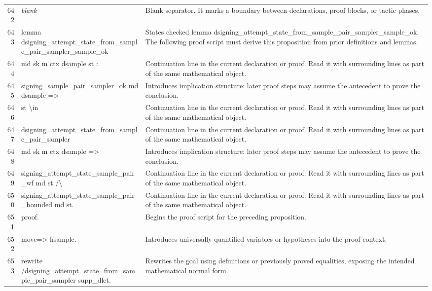\documentclass[10pt]{article}
\begin{document}
\begin{longtable}{r L{0.53\textwidth} L{0.37\textwidth}}
642 & {\ttfamily\scriptsize \emph{blank}} & Blank separator.  It marks a boundary between declarations, proof blocks, or tactic phases. \\
643 & {\ttfamily\scriptsize lemma dsigning\_attempt\_state\_from\_sample\_pair\_sampler\_sample\_ok} & States checked lemma dsigning\_attempt\_state\_from\_sample\_pair\_sampler\_sample\_ok.  The following proof script must derive this proposition from prior definitions and lemmas. \\
644 & {\ttfamily\scriptsize    md sk m ctx dsample st :} & Continuation line in the current declaration or proof.  Read it with surrounding lines as part of the same mathematical object. \\
645 & {\ttfamily\scriptsize   signing\_sample\_pair\_sampler\_ok md dsample =>} & Introduces implication structure: later proof steps may assume the antecedent to prove the conclusion. \\
646 & {\ttfamily\scriptsize   st \textbackslash{}in} & Continuation line in the current declaration or proof.  Read it with surrounding lines as part of the same mathematical object. \\
647 & {\ttfamily\scriptsize     dsigning\_attempt\_state\_from\_sample\_pair\_sampler} & Continuation line in the current declaration or proof.  Read it with surrounding lines as part of the same mathematical object. \\
648 & {\ttfamily\scriptsize       md sk m ctx dsample =>} & Introduces implication structure: later proof steps may assume the antecedent to prove the conclusion. \\
649 & {\ttfamily\scriptsize   signing\_attempt\_state\_sample\_pair\_wf md st /\textbackslash{}} & Continuation line in the current declaration or proof.  Read it with surrounding lines as part of the same mathematical object. \\
650 & {\ttfamily\scriptsize   signing\_attempt\_state\_sample\_pair\_bounded md st.} & Continuation line in the current declaration or proof.  Read it with surrounding lines as part of the same mathematical object. \\
651 & {\ttfamily\scriptsize proof.} & Begins the proof script for the preceding proposition. \\
652 & {\ttfamily\scriptsize move=> hsample.} & Introduces universally quantified variables or hypotheses into the proof context. \\
653 & {\ttfamily\scriptsize rewrite /dsigning\_attempt\_state\_from\_sample\_pair\_sampler supp\_dlet.} & Rewrites the goal using definitions or previously proved equalities, exposing the intended mathematical normal form. \\

\end{longtable}
\end{document}
